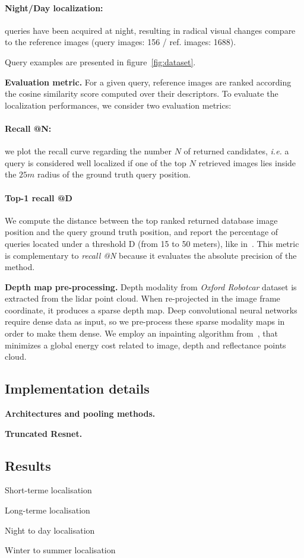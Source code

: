 	\paragraph{Night/Day localization:} queries have been acquired at night, resulting in radical visual changes compare to the reference images (query images: 156 / ref. images: 1688).

Query examples are presented in figure~\ref{fig:dataset}.
	
\noindent\textbf{Evaluation metric.} For a given query, reference images are ranked according the cosine similarity score computed over their descriptors. To evaluate the localization performances, we consider two evaluation metrics:
	\setcounter{paragraph}{0}
	\paragraph{Recall @N:} we plot the recall curve regarding the number $N$ of returned candidates, {\it i.e.} a query is considered well localized if one of the top $N$ retrieved images lies inside the $25m$ radius of the ground truth query position.
	\paragraph{Top-1 recall @D} We compute the distance between the top ranked returned database image position and the query ground truth position, and report the percentage of queries located under a threshold D (from 15 to 50 meters), like in~\cite{Zamir2014}. This metric is complementary to \textit{recall @N} because it evaluates the absolute precision of the method.
	
\noindent\textbf{Depth map pre-processing.} Depth modality from \textit{Oxford Robotcar} dataset is extracted from the lidar point cloud. When re-projected in the image frame coordinate, it produces a sparse depth map. Deep convolutional neural networks require dense data as input, so we pre-process these sparse modality maps in order to make them dense. We employ an inpainting algorithm from~\cite{Bevilacqua2017}, that minimizes a global energy cost related to image, depth and reflectance points cloud. 

\subsection{Implementation details}
\label{subsec:implementation}

\noindent\textbf{Architectures and pooling methods.}


\noindent\textbf{Truncated Resnet.}

\subsection{Results}
\label{subsec:results}

Short-terme localisation

Long-terme localisation

Night to day localisation

Winter to summer localisation
